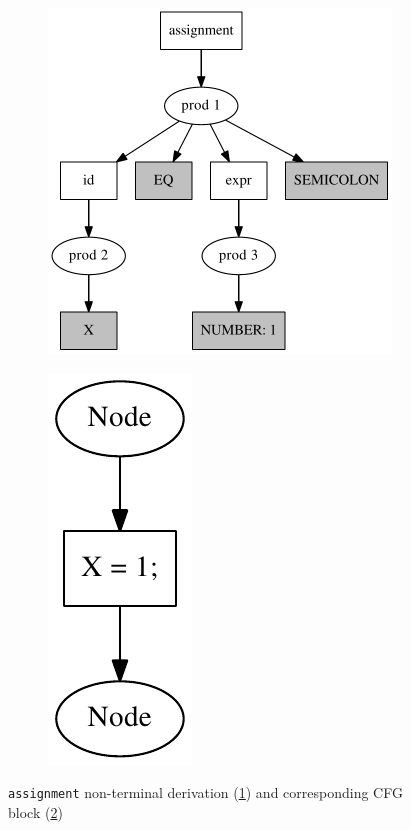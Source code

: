 \documentclass{sig-alternate-05-2015}
\begin{document}
\begin{figure}[h!]
  \begin{center}
    \begin{subfigure}{0.3\textwidth}    
        \includegraphics[scale=0.3]{Graphs/cfg_idea.pdf}    
    \caption{}
    \label{simple_a}
    \end{subfigure}
    \begin{subfigure}{0.1\textwidth}      
            \includegraphics[scale=0.5]{Graphs/assignment_simple.pdf}        
     \caption{}
     \label{simple_b}
    \end{subfigure}
    \caption{\texttt{assignment} non-terminal derivation (\ref{simple_a}) and corresponding CFG block (\ref{simple_b})}
    \label{simple_example_pic}
  \end{center}
\end{figure}
\end{document}
